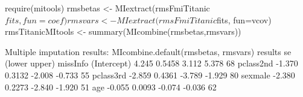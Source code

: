 \begin{Schunk}
\begin{Sinput}
 require(mitools)
 rmsbetas <- MIextract(rmsFmiTitanic$fits, fun=coef)
 rmsvars <- MIextract(rmsFmiTitanic$fits, fun=vcov)
 rmsTitanicMItools <- summary(MIcombine(rmsbetas,rmsvars))
\end{Sinput}
\begin{Soutput}
Multiple imputation results:
      MIcombine.default(rmsbetas, rmsvars)
            results     se (lower upper) missInfo
(Intercept)   4.245 0.5458  3.112  5.378     68 %
pclass2nd    -1.370 0.3132 -2.008 -0.733     55 %
pclass3rd    -2.859 0.4361 -3.789 -1.929     80 %
sexmale      -2.380 0.2273 -2.840 -1.920     51 %
age          -0.055 0.0093 -0.074 -0.036     62 %
\end{Soutput}
\end{Schunk}
